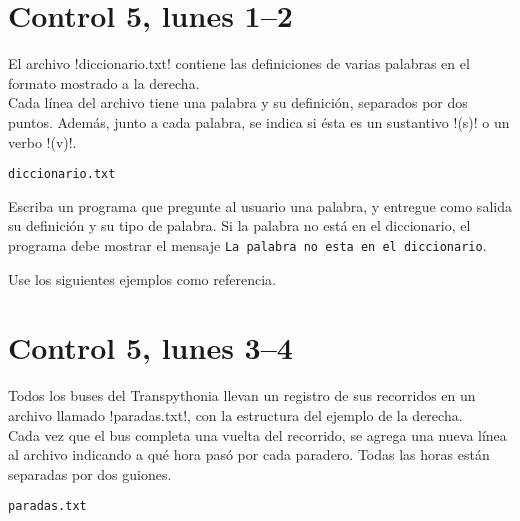 \documentclass[12pt,spanish,a5paper,landscape]{article}
\begin{document}
  \pagestyle{empty}
  \thispagestyle{empty}

  \part*{Control 5, lunes 1--2}
  \newpage

  \begin{minipage}[t]{0.45\textwidth}
    El archivo \li!diccionario.txt!
    contiene las definiciones de varias palabras
    en el formato mostrado a la derecha.
    \\[2ex]
    Cada línea del archivo tiene una palabra y su definición,
    separados por dos puntos.
    Además, junto a cada palabra,
    se indica si ésta es un sustantivo \li!(s)!
    o un verbo \li!(v)!.
  \end{minipage}
  \hfill
  \begin{minipage}[t]{0.45\textwidth}
    \hfil\verb!diccionario.txt!\hfil
    \small
    
  \end{minipage}

  Escriba un programa que pregunte al usuario una palabra,
  y entregue como salida su definición y su tipo de palabra.
  Si la palabra no está en el diccionario,
  el programa debe mostrar el mensaje
  \texttt{La palabra no esta en el diccionario}.

  Use los siguientes ejemplos como referencia.

  \begin{minipage}[t]{0.6\textwidth}
    
  \end{minipage}

  \begin{minipage}[t]{0.6\textwidth}
    
  \end{minipage}

  \newpage

  \part*{Control 5, lunes 3--4}
  \newpage

  \begin{minipage}[t]{0.45\textwidth}
    Todos los buses del Transpythonia
    llevan un registro de sus recorridos
    en un archivo llamado \li!paradas.txt!,
    con la estructura del ejemplo de la derecha.
    \\[2ex]
    Cada vez que el bus completa una vuelta del recorrido,
    se agrega una nueva línea al archivo
    indicando a qué hora pasó por cada paradero.
    Todas las horas están separadas por dos guiones.
  \end{minipage}
  \hfill
  \begin{minipage}[t]{0.45\textwidth}
    \hfil\verb!paradas.txt!\hfil
    \small
    
  \end{minipage}
\end{document}
